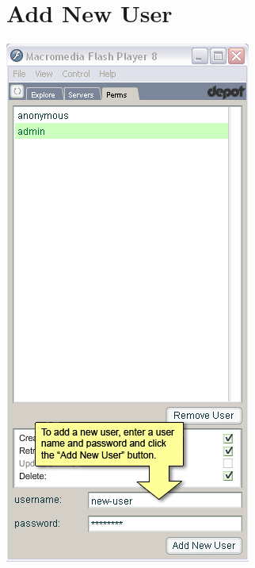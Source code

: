 \documentclass{report}
\begin{document}
\section{Add New User}
\begin{center}
\includegraphics[scale=0.5]{users-images/Step11-annotated.png}

\end{center}
\end{document}
